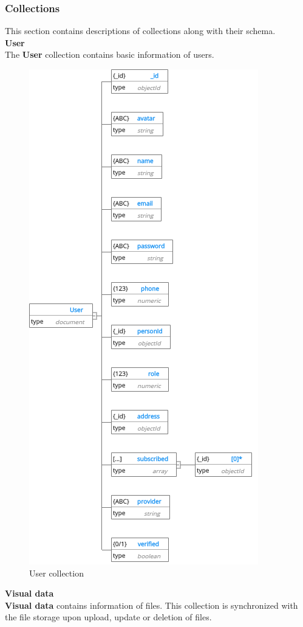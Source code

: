 \subsubsection{Collections}
This section contains descriptions of collections along with their schema.\\
\textbf{User}\\
The \textbf{User} collection contains basic information of users.
\begin{center}
	\begin{figure}[H]
		\centering
		\includegraphics[width=0.5\columnwidth]{images/chap4/User.png}
		\caption{User collection}
	\end{figure}
\end{center}
\cleardoublepage
\textbf{Visual data}\\
\textbf{Visual data} contains information of files. This collection is synchronized with the file storage upon upload, update or deletion of files.

